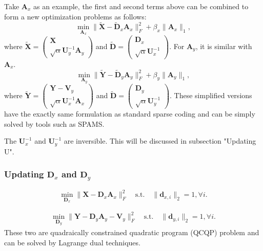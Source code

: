 \documentclass[10pt,twocolumn,letterpaper]{article}
\begin{document}
Take $\mathbf{A}_{x}$ as an example, the first and second terms above can be combined to form a new optimization problems as follows:
\begin{equation}
\min_{\mathbf{A}_{x}}
\|\widetilde{\mathbf{X}}-\widetilde{\mathbf{D}}_{x}\mathbf{A}_{x}\|_{F}^{2}
+
\beta_{x}\|\mathbf{A}_{x}\|_{1},
\end{equation}
where 
$
\widetilde{\mathbf{X}}
=
\left(\begin{array}{c}
\mathbf{X}
\\
\sqrt{\alpha}\mathbf{U}_{y}^{-1}\mathbf{A}_{y}
\end{array}\right)
$
and
$
\widetilde{\mathbf{D}}
=
\left(\begin{array}{c}
\mathbf{D}_{x}
\\
\sqrt{\alpha}\mathbf{U}_{x}^{-1}
\end{array}\right)
$.
For $\mathbf{A}_{y}$, it is similar with $\mathbf{A}_{x}$.
\begin{equation}
\min_{\mathbf{A}_{y}}
\|\widetilde{\mathbf{Y}}-\widetilde{\mathbf{D}}_{y}\mathbf{A}_{y}\|_{F}^{2}
+
\beta_{y}\|\mathbf{A}_{y}\|_{1},
\end{equation}
where 
$
\widetilde{\mathbf{Y}}
=
\left(\begin{array}{c}
\mathbf{Y}-\mathbf{V}_{y}
\\
\sqrt{\alpha}\mathbf{U}_{x}^{-1}\mathbf{A}_{x}
\end{array}\right)
$
and
$
\widetilde{\mathbf{D}}
=
\left(\begin{array}{c}
\mathbf{D}_{y}
\\
\sqrt{\alpha}\mathbf{U}_{y}^{-1}
\end{array}\right)
$.
These simplified versions have the exactly same formulation as standard sparse coding and can be simply solved by tools such as SPAMS.

The $\mathbf{U}_{x}^{-1}$ and $\mathbf{U}_{y}^{-1}$ are inversible. This will be discussed in subsection "Updating U".

\subsubsection{Updating $\mathbf{D}_{x}$ and $\mathbf{D}_{y}$}
\begin{equation}
\min_{\mathbf{D}_{x}}
\|\mathbf{X}-\mathbf{D}_{x}\mathbf{A}_{x}\|_{F}^{2}
\quad
\text{s.t.}
\quad
\|\mathbf{d}_{x,i}\|_{2}=1,
\forall{i}.
\end{equation}

\begin{equation}
\begin{split}
\min_{\mathbf{D}_{y}}
\|\mathbf{Y}-\mathbf{D}_{y}\mathbf{A}_{y}-\mathbf{V}_{y}\|_{F}^{2}
\quad 
\text{s.t.}
\quad 
\|\mathbf{d}_{y,i}\|_{2}=1,
\forall{i}.
\end{split}
\end{equation}
These two are quadraically constrained quadratic program (QCQP) problem and can be solved by Lagrange dual techniques.
\end{document}
